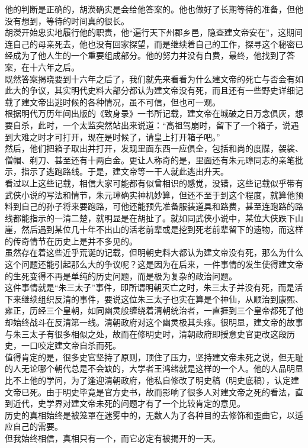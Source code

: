 \begin{multicols}{\theparacolNo}
他的判断是正确的，胡濙确实是会给他答案的。他也做好了长期等待的准备，但他没有想到，等待的时间真的很长。\\

胡濙开始忠实地履行他的职责，他“遍行天下州郡乡邑，隐查建文帝安在”，这期间连自己的母亲死去，他也没有回家探望，而是继续着自己的工作，探寻这个秘密已经成为了他人生的一个重要组成部分。他的努力并没有白费，最终，他找到了答案，在十六年之后。\\

既然答案揭晓要到十六年之后了，我们就先来看看为什么建文帝的死亡与否会有如此大的争议，其实明代史料大部分都认为建文帝没有死，而且还有一些野史详细记载了建文帝出逃时候的各种情况，虽不可信，但也可一观。\\

根据明代万历年间出版的《致身录》一书所记载，建文帝在城破之日万念俱灰，想要自杀，此时，一个太监突然站出来说道：“高祖驾崩时，留下了一个箱子，说遇到大难之时才可打开，现在是时候了，请皇上打开箱子吧。”\\

然后，他们把箱子取出并打开，发现里面东西一应俱全，包括和尚的度牒，袈裟、僧帽、剃刀、甚至还有十两白金。更让人称奇的是，里面还有朱元璋同志的亲笔批示，指示了逃跑路线。于是，建文帝等一干人就此逃出升天。\\

看过以上这些记载，相信大家可能都有似曾相识的感觉，没错，这些记载似乎带有武侠小说的写法和情节，朱元璋确实神机妙算，但还不至于到这个程度，就算他预料到自己的孙子将来要跑路，可他还能预先准备服装道具和路费，甚至连跑路的路线都能指示的一清二楚，就明显是在胡扯了。就如同武侠小说中，某位大侠跌下山崖，然后遇到某位几十年不出山的活老前辈或是挖到死老前辈留下的遗物，而这样的传奇情节在历史上是并不多见的。\\

虽然存在着这些近乎荒诞的记载，但明朝史料大都认为建文帝没有死，那么为什么这个问题还能引起那么大的争议呢？这是因为在后来，一件事情的发生使得建文帝的生死变得不再是单纯的历史问题，而是极为复杂的政治问题。\\

这件事情就是“朱三太子”事件，即所谓明朝灭亡之时，朱三太子并没有死，而是活下来继续组织反清的事件，要说这位朱三太子也实在算是个神仙，从顺治到康熙、雍正，历经三个皇朝，如同幽灵般缠绕着清朝统治者，一直捱到三个皇帝都死了他却始终战斗在反清第一线。清朝政府对这个幽灵极其头疼。很明显，建文帝的故事与朱三太子有很多相似之处，故而在修明史时，清朝政府即授意史官更改这段历史，一口咬定建文帝自杀而死。\\

值得肯定的是，很多史官坚持了原则，顶住了压力，坚持建文帝未死之说，但无耻的人无论哪个朝代总是不会缺的，大学者王鸿绪就是这样的一个人。他的人品明显比不上他的学问，为了逢迎清朝政府，他私自修改了明史稿（明史底稿），认定建文帝已死。由于明史毕竟是官方史书，故而影响了很多人对建文帝之死的看法，直到近代，史学界对建文帝未死的问题才有了一个比较肯定的意见。\\

历史的真相始终是被笼罩在迷雾中的，无数人为了各种目的去修饰和歪曲它，以适应自己的需要。\\

但我始终相信，真相只有一个，而它必定有被揭开的一天。\\
\ifnum{}
	\end{multicols}
\fi
\newpage
